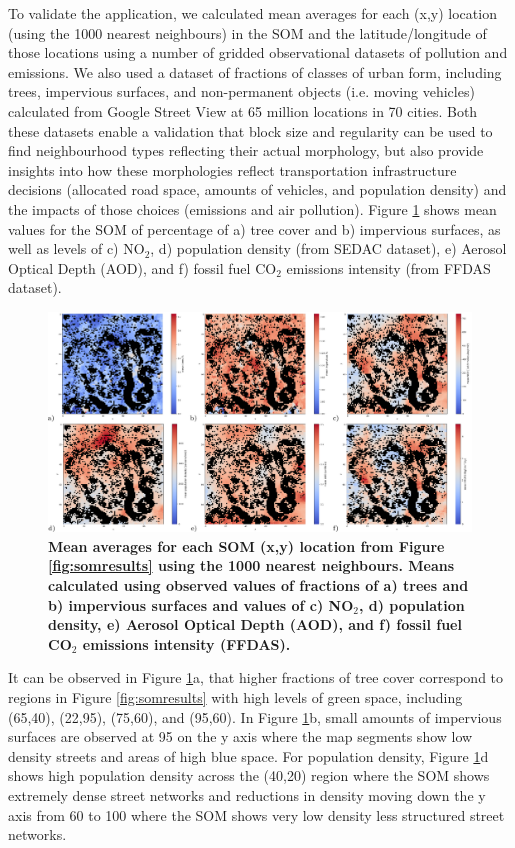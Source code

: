 \documentclass[9pt,twocolumn,twoside,lineno]{pnas-new}
\begin{document}
To validate the application, we calculated mean averages for each (x,y) location (using the 1000 nearest neighbours) in the SOM and the latitude/longitude of those locations using a number of gridded observational datasets of pollution and emissions. We also used a dataset of fractions of classes of urban form, including trees, impervious surfaces, and non-permanent objects (i.e. moving vehicles) calculated from Google Street View at 65 million locations in 70 cities\cite{Middel2019,Middel2018}. Both these datasets enable a validation that block size and regularity can be used to find neighbourhood types reflecting their actual morphology, but also provide insights into how these morphologies reflect transportation infrastructure decisions (allocated road space, amounts of vehicles, and population density) and the impacts of those choices (emissions and air pollution). Figure \ref{fig:meansomresults} shows mean values for the SOM of percentage of a) tree cover and b) impervious surfaces, as well as levels of c) NO$_{2}$, d) population density (from SEDAC dataset), e) Aerosol Optical Depth (AOD), and f) fossil fuel CO$_{2}$ emissions intensity (from FFDAS dataset).

\begin{figure}
\centering
\includegraphics[trim={0 0 0 0},clip,scale=0.14]{BlockTypologies_Figures4-0.png}
\caption{\bf Mean averages for each SOM (x,y) location from Figure \ref{fig:somresults} using the 1000 nearest neighbours. Means calculated using observed values of fractions of a) trees and b) impervious surfaces and values of c) NO$_{2}$, d) population density, e) Aerosol Optical Depth (AOD), and f) fossil fuel CO$_{2}$ emissions intensity (FFDAS).}
 \label{fig:meansomresults}
\end{figure} 

It can be observed in Figure \ref{fig:meansomresults}a, that higher fractions of tree cover correspond to regions in Figure \ref{fig:somresults} with high levels of green space, including (65,40), (22,95), (75,60), and (95,60). In Figure \ref{fig:meansomresults}b, small amounts of impervious surfaces are observed at 95 on the y axis where the map segments show low density streets and areas of high blue space. For population density, Figure \ref{fig:meansomresults}d shows high population density across the (40,20) region where the SOM shows extremely dense street networks and reductions in density moving down the y axis from 60 to 100 where the SOM shows very low density less structured street networks.
\end{document}
